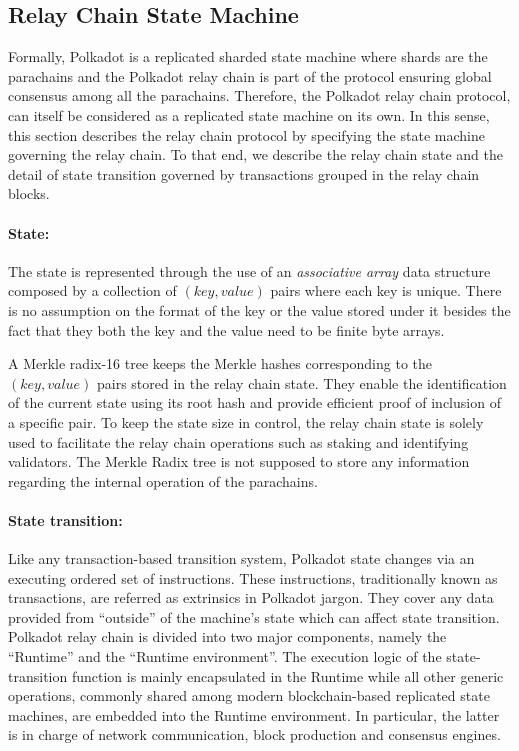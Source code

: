 \subsection{Relay Chain State Machine}\label{sec:relaychain}

Formally, Polkadot is a replicated sharded state machine where shards are the parachains and the Polkadot relay chain is part of the protocol ensuring global consensus among all the parachains. Therefore, the Polkadot relay chain protocol, can itself be considered as a replicated state machine on its own. In this sense, this section describes the relay chain protocol by specifying the state machine governing the relay chain. To that end, we describe the relay chain state and the detail of state transition governed by transactions grouped in the relay chain blocks.

\paragraph{State:} The state is represented through the use of an \emph{associative array} data structure composed by a collection of $(key, value)$ pairs where each key is unique. There is no assumption on the format of the key or the value stored under it besides the fact that they both the key and the value need to be finite byte arrays.

A Merkle radix-16 tree keeps the Merkle hashes corresponding to the $(key, value)$ pairs stored in the relay chain state. They enable the identification of the current state using its root hash and provide efficient proof of inclusion of a specific pair. To keep the state size in control, the relay chain state is solely used to facilitate the relay chain operations such as staking and identifying validators. The Merkle Radix tree is not supposed to store any information regarding the internal operation of the parachains.

\paragraph{State transition: } \label{par:state_transition} Like any transaction-based transition system, Polkadot state changes via an executing ordered set of instructions. These instructions, traditionally known as transactions, are referred as extrinsics in Polkadot jargon. They cover any data provided from ``outside'' of the machine's state which can affect state transition. Polkadot relay chain is divided into two major components, namely the ``Runtime'' and the ``Runtime environment''. The execution logic of the state-transition function is mainly encapsulated in the Runtime while all other generic operations, commonly shared among modern blockchain-based replicated state machines, are embedded into the Runtime environment. In particular, the latter is in charge of network communication, block production and consensus engines.

